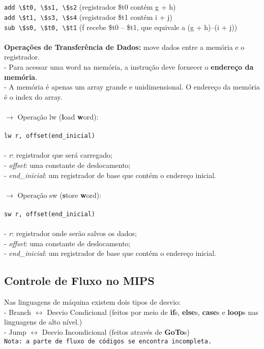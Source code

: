 \documentclass[12pt]{article}
\begin{document}
    \\~\\\verb#add \$t0, \$s1, \$s2# (registrador \$t0 contém g + h)
    \\\verb#add \$t1, \$s3, \$s4# (registrador \$t1 contém i + j)
    \\\verb#sub \$s0, \$t0, \$t1# (f recebe \$t0 – \$t1, que equivale a (g + h)–(i + j))
    \\~\\\textbf{Operações de Transferência de Dados:} move dados entre a memória e o registrador.
    \\- Para acessar uma word na memória, a instrução deve fornecer o \textbf{endereço da memória}.
    \\- A memória é apenas um array grande e unidimensional. O endereço da memória é o index do array.
    \\~\\$\rightarrow$ Operação lw (\textbf{l}oad \textbf{w}ord):
    \\~\\\verb#lw r, offset(end_inicial)#
    \\~\\- \textit{r}: registrador que será carregado;
    \\- \textit{offset}: uma constante de deslocamento;
    \\- \textit{end\_inicial}: um registrador de base que contém o endereço inicial.
    \\~\\$\rightarrow$ Operação sw (\textbf{s}tore \textbf{w}ord):
    \\~\\\verb#sw r, offset(end_inicial)#
    \\~\\- \textit{r}: registrador onde serão salvos os dados;
    \\- \textit{offset}: uma constante de deslocamento;
    \\- \textit{end\_inicial}: um registrador de base que contém o endereço inicial.

    \subsection{Controle de Fluxo no MIPS}
    Nas linguagens de máquina existem dois tipos de desvio:
    \\- Branch $\leftrightarrow$ Desvio Condicional (feitos por meio de \textbf{if}s, \textbf{else}s, \textbf{case}s e \textbf{loop}s nas linguagens de alto nível.)
    \\- Jump $\leftrightarrow$ Desvio Incondicional (feitos através de \textbf{GoTo}s)
    \\\verb#Nota: a parte de fluxo de códigos se encontra incompleta.#
\end{document}
